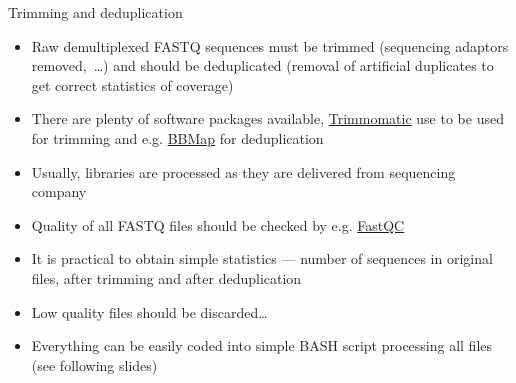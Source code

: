 \documentclass[compress,  xelatex, 11pt, xcolor=x11names, aspectratio=169,
	hyperref={
		bookmarks=true,
		unicode=true,
		colorlinks=true,
		pdftitle={HybSeq course},
		plainpages=false,
		pdfauthor={Vojtech Zeisek},
		pdfsubject={Practical processing of HybSeq target enrichment sequencing data on computing grids like MetaCentrum},
		pdfcreator={XeLaTeX},
		pdfkeywords={BASH, command line, GNU, HybSeq, Linux, MetaCentrum, sequencing shell, target enrichment},
		linkcolor=Turquoise4, %
		anchorcolor=DodgerBlue4, %
		citecolor=DodgerBlue4, %
		filecolor=DodgerBlue4, %
		menucolor=Tan4, %
		urlcolor=DarkOliveGreen4 %
		},
	url={hyphens, lowtilde} %
	]{beamer}
\begin{document}
\begin{frame}{Trimming and deduplication}
	\begin{itemize}
		\item Raw demultiplexed FASTQ sequences must be trimmed (sequencing adaptors removed,~\ldots) and should be deduplicated (removal of artificial duplicates to get correct statistics of coverage)
		\item There are plenty of software packages available, \href{http://www.usadellab.org/cms/?page=trimmomatic}{Trimmomatic} use to be used for trimming and e.g. \href{https://sourceforge.net/projects/bbmap/}{BBMap} for deduplication
		\item Usually, libraries are processed as they are delivered from sequencing company
		\item Quality of all FASTQ files should be checked by e.g. \href{https://www.bioinformatics.babraham.ac.uk/projects/fastqc/}{FastQC}
		\item It is practical to obtain simple statistics --- number of sequences in original files, after trimming and after deduplication
		\item Low quality files should be discarded\ldots
		\item Everything can be easily coded into simple BASH script processing all files (see following slides)
	\end{itemize}
\end{frame}
\end{document}
